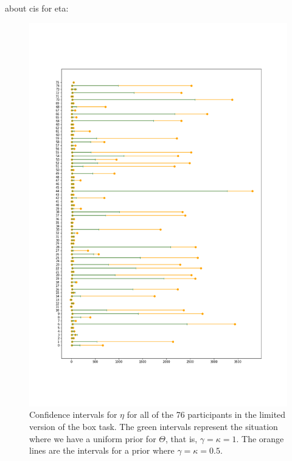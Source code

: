 about cis for eta:
\begin{figure}
    \centering
    \includegraphics[scale=0.37]{pictures/Sensitivity/ci_lim_eta.png}
    \caption[CIs for $\eta$ for all participants with two different priors, limited]{Confidence intervals for $\eta$ for all of the 76 participants in the limited version of the box task. The green intervals represent the situation where we have a uniform prior for $\Theta$, that is, $\gamma=\kappa=1$. The orange lines are the intervals for a prior where $\gamma=\kappa=0.5$.}
    \label{fig:sensitivity_ci_lim_eta}
\end{figure}